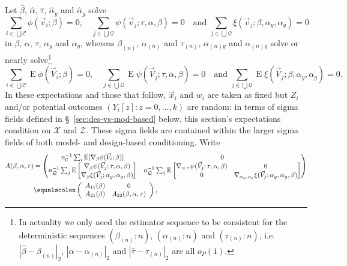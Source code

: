 \documentclass{article}
\newcommand{\eqdef}{\ensuremath{\equalscolon}}
\newcommand{\EE}{\operatorname{E}}
\begin{document}
Let $\hat\beta$, $\hat{\alpha}$, $\hat\tau$, $\hat{\alpha}_{y}$ and $\hat{\alpha}_{g}$ solve
\[\sum_{i\in \bigcup \mathcal{C}}\phi(\vec{v}_{i}; \beta )
  =0,\quad
\sum_{j\in \bigcup \mathcal{Q}}\psi(\vec{v}_{j}; \tau,
\alpha, \beta )  =0 \quad \text{and } \sum_{j\in \bigcup \mathcal{Q}}\xi(\vec{v}_{j}; \beta, \alpha_{y}, \alpha_{g})=0
  \]
  in $\beta$, $\alpha$, $\tau$, $\alpha_{y}$ and $\alpha_{g}$, whereas $\beta_{(n)}$, $\alpha_{(n)}$ and $\tau_{(n)}$, $\alpha_{(n)y}$ and $\alpha_{(n)g}$ solve or nearly solve\footnote{%
In actuality we only need the estimator sequence to be consistent for the deterministic sequences $(\beta_{(n)}:n)$, $(\alpha_{(n)}:n)$ and $(\tau_{(n)}:n)$, i.e. $|\hat\beta - \beta_{(n)}|_{2}$, $|\hat{\alpha} - \alpha_{(n)}|_{2}$ and $|\hat\tau - \tau_{(n)}|_{2}$ are all $o_{P}(1)$.%
}
\[\sum_{i\in \bigcup \mathcal{C}}\EE\phi(\vec{V}_{i}; \beta )
  =0,\quad
\sum_{j\in \bigcup \mathcal{Q}}\EE\psi(\vec{V}_{j}; \tau,
\alpha, \beta )  =0 \quad\text{and }
\sum_{j\in \bigcup \mathcal{Q}}\EE\xi(\vec{V}_{j}; \beta, \alpha_{y}, \alpha_{g})=0.
  \]
In these expectations and those that follow, $\vec{x}_{i}$ and $w_{i}$
are taken as fixed but $Z_{i}$ and/or potential outcomes $(Y_{i}[z]:
z=0, \ldots, k)$ are random: in terms of sigma fields defined in \S~\ref{sec:des-vs-mod-based} below, this section's expectations condition on $\mathcal{X}$ and $\mathcal{Z}$.  These sigma fields are contained within the larger sigma fields of both model- and design-based conditioning.  Write
\begin{align}
\nonumber
  A(\beta, \alpha, \tau) &=
\begin{pmatrix}                           
        n_{\mathcal{C}}^{-1}\sum_{i}\EE [\nabla_{\beta}\phi(\vec{V}_{i};
        \beta )]&0\\
        n_{\mathcal{Q}}^{-1}\sum_{j}\EE\begin{bmatrix}
    \nabla_{\beta}\psi(\vec{V}_{j};\tau, \alpha, \beta )\\
    \nabla_{\beta}\xi(\vec{V}_{j};\alpha_{y},\alpha_{g}, \beta )\\
  \end{bmatrix} &
n_{\mathcal{Q}}^{-1}\sum_{j}\EE\begin{bmatrix}
                    \nabla_{\alpha, \tau}\psi(\vec{V}_{j}; \tau, \alpha, \beta ) & 0\\
                    0 & \nabla_{\alpha_{y}, \alpha_{g}}\xi(\vec{V}_{j};\alpha_{y},\alpha_{g}, \beta)\\
\end{bmatrix}\\
                  \end{pmatrix}\\
    \label{eq:13}
    &\eqdef \left(
      \begin{array}{cc}
        A_{11}(\beta)& 0\\
        A_{21}(\beta) & A_{22}(\beta, \alpha, \tau)
      \end{array}
\right),
  \end{align}
\end{document}
